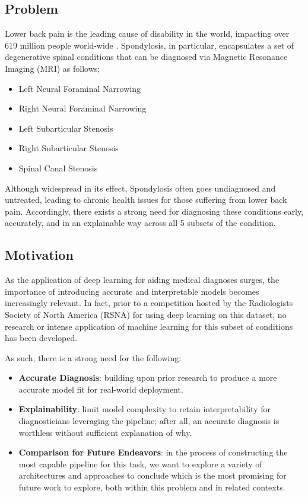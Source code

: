 \documentclass[conference]{IEEEtran}
\begin{document}
\subsection{Problem}
Lower back pain is the leading cause of disability in the world, impacting over 619 million people world-wide \cite{WHO}. Spondylosis, in particular, encapsulates a set of degenerative spinal conditions that can be diagnosed via Magnetic Resonance Imaging (MRI) as follows;
\begin{itemize}
    \item Left Neural Foraminal Narrowing
    \item Right Neural Foraminal Narrowing
    \item Left Subarticular Stenosis
    \item Right Subarticular Stenosis
    \item Spinal Canal Stenosis
\end{itemize}

Although widespread in its effect, Spondylosis often goes undiagnosed and untreated, leading to chronic health issues for those suffering from lower back pain. Accordingly, there exists a strong need for diagnosing these conditions early, accurately, and in an explainable way across all 5 subsets of the condition.

\subsection{Motivation}
As the application of deep learning for aiding medical diagnoses surges, the importance of introducing accurate and interpretable models becomes increasingly relevant. In fact, prior to a competition hosted by the Radiologists Society of North America (RSNA) for using deep learning on this dataset, no research or intense application of machine learning for this subset of conditions has been developed.

As such, there is a strong need for the following:
\begin{itemize}
    \item \textbf{Accurate Diagnosis}: building upon prior research to produce a more accurate model fit for real-world deployment.
    
    \item \textbf{Explainability}: limit model complexity to retain interpretability for diagnosticians leveraging the pipeline; after all, an accurate diagnosis is worthless without sufficient explanation of why.

    \item \textbf{Comparison for Future Endeavors}: in the process of constructing the most capable pipeline for this task, we want to explore a variety of architectures and approaches to conclude which is the most promising for future work to explore, both within this problem and in related contexts.
\end{itemize}
\end{document}
